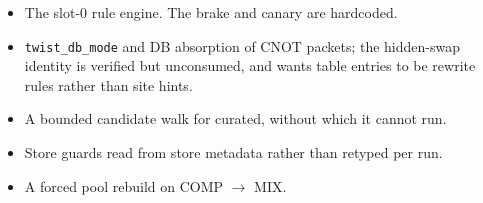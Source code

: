 \documentclass[11pt]{article}
\begin{document}
\begin{itemize}
\item The slot-0 rule engine. The brake and canary are hardcoded.
\item \texttt{twist_db_mode} and DB absorption of CNOT packets; the hidden-swap
identity is verified but unconsumed, and wants table entries to be rewrite rules
rather than site hints.
\item A bounded candidate walk for curated, without which it cannot run.
\item Store guards read from store metadata rather than retyped per run.
\item A forced pool rebuild on COMP $\to$ MIX.
\end{itemize}
\end{document}

